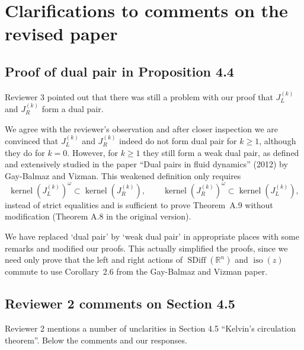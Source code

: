 \documentclass{article}
\def\R{\mathbb{R} }
\def\R{\mathbb{R} }
\DeclareMathOperator{\SDiff}{SDiff}
\DeclareMathOperator{\iso}{iso}
\DeclareMathOperator{\kernel}{kernel}
\begin{document}
\section{Clarifications to comments on the revised paper}

\subsection{Proof of dual pair in Proposition 4.4}

Reviewer 3 pointed out that there was still a problem with our proof
that $J_L^{(k)}$ and $J_R^{(k)}$ form a dual pair.

We agree with the reviewer's observation and after closer inspection
we are convinced that $J_L^{(k)}$ and $J_R^{(k)}$ indeed do not form
dual pair for $k \ge 1$, although they do for $k = 0$. However, for
$k \ge 1$ they still form a weak dual pair, as defined and extensively
studied in the paper ``Dual pairs in fluid dynamics'' (2012) by
Gay-Balmaz and Vizman. This weakened definition only requires
\begin{equation*}
  \kernel(J_L^{(k)})^\omega \subset \kernel(J_R^{(k)}), \qquad
  \kernel(J_R^{(k)})^\omega \subset \kernel(J_L^{(k)}),
\end{equation*}
instead of strict equalities and is sufficient to prove Theorem~A.9
without modification (Theorem A.8 in the original version).

We have replaced `dual pair' by `weak dual pair' in appropriate places
with some remarks and modified our proofs. This actually simplified
the proofs, since we need only prove that the left and right actions
of $\SDiff(\R^n)$ and $\iso(z)$ commute to use Corollary~2.6 from the
Gay-Balmaz and Vizman paper.

\subsection{Reviewer 2 comments on Section 4.5}

Reviewer 2 mentions a number of unclarities in Section 4.5 ``Kelvin's
circulation theorem''. Below the comments and our responses.
\end{document}

